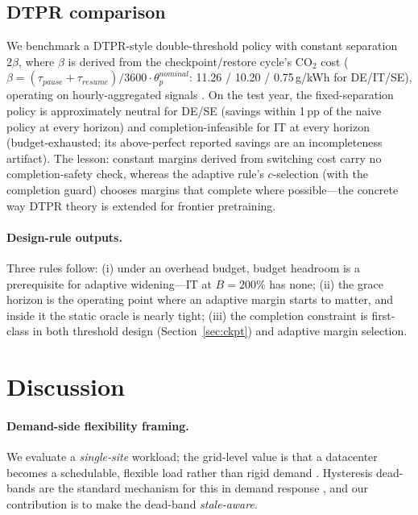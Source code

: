 \documentclass[sigconf,nonacm=false]{acmart}
\begin{document}
\subsection{DTPR comparison}
We benchmark a DTPR-style double-threshold policy with constant separation
$2\beta$, where $\beta$ is derived from the checkpoint/restore cycle's CO$_2$
cost ($\beta = (\tau_{pause}+\tau_{resume})/3600 \cdot \theta_p^{nominal}$:
11.26 / 10.20 / 0.75\,g/kWh for DE/IT/SE), operating on hourly-aggregated
signals \cite{lechowicz2023opr}. On the test year, the fixed-separation policy
is approximately neutral for DE/SE (savings within 1\,pp of the naive policy at
every horizon) and completion-infeasible for IT at every horizon
(budget-exhausted; its above-perfect reported savings are an incompleteness
artifact). The lesson:
constant margins derived from switching cost carry no completion-safety check,
whereas the adaptive rule's $c$-selection (with the completion guard) chooses
margins that complete where possible---the concrete way DTPR theory is extended
for frontier pretraining.

\paragraph{Design-rule outputs.}
Three rules follow: (i) under an overhead budget, budget headroom is a
prerequisite for adaptive widening---IT at $B{=}200\%$ has none; (ii) the
grace horizon is the operating point where an adaptive margin starts to matter,
and inside it the static oracle is nearly tight; (iii) the completion
constraint is first-class in both threshold design (Section~\ref{sec:ckpt}) and
adaptive margin selection.

\section{Discussion}
\label{sec:discussion}

\paragraph{Demand-side flexibility framing.}
We evaluate a \emph{single-site} workload; the grid-level value is that a
datacenter becomes a schedulable, flexible load rather than rigid demand
\cite{lin2023adapting,lin2024explodingai}. Hysteresis dead-bands are the
standard mechanism for this in demand response \cite{perfumo2011tcl}, and our
contribution is to make the dead-band \emph{stale-aware}.
\end{document}
